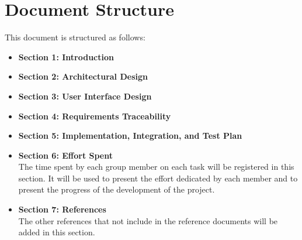 \section{Document Structure}\label{sec:structure}
This document is structured as follows:
\begin{itemize}
    \item \textbf{Section 1: Introduction} 
    \\ 
    \item \textbf{Section 2: Architectural Design}
    \\ 
    \item \textbf{Section 3: User Interface Design}
    \\
    \item \textbf{Section 4: Requirements Traceability}
    \\
    \item \textbf{Section 5: Implementation, Integration, and Test Plan}
    \\
    \item \textbf{Section 6: Effort Spent}
    \\The time spent by each group member on each task will be registered in this section. It will be used to present the effort dedicated 
    by each member and to present the progress of the development of the project.
    \item \textbf{Section 7: References}
    \\ The other references that not include in the reference documents will be added in this section.
\end{itemize}